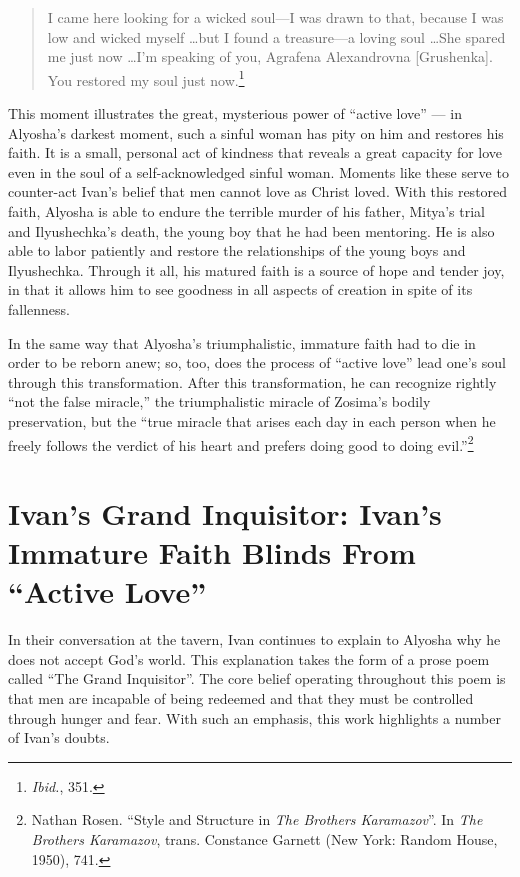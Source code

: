 \begin{quote}
\onehalfspacing
I came here looking for a wicked soul---I was drawn to that, because I was low and wicked myself \ldots but I found a treasure---a loving soul \ldots She spared me just now \ldots I'm speaking of you, Agrafena Alexandrovna [Grushenka]. You restored my soul just now.\footnote{\emph{Ibid.}, 351.}
\end{quote}

This moment illustrates the great, mysterious power of ``active love'' --- in Alyosha's darkest moment, such a sinful woman has pity on him and restores his faith. It is a small, personal act of kindness that reveals a great capacity for love even in the soul of a self-acknowledged sinful woman. Moments like these serve to counter-act Ivan's belief that men cannot love as Christ loved. With this restored faith, Alyosha is able to endure the terrible murder of his father, Mitya's trial and Ilyushechka's death, the young boy that he had been mentoring. He is also able to labor patiently and restore the relationships of the young boys and Ilyushechka. Through it all, his matured faith is a source of hope and tender joy, in that it allows him to see goodness in all aspects of creation in spite of its fallenness. 

In the same way that Alyosha's triumphalistic, immature faith had to die in order to be reborn anew; so, too, does the process of ``active love'' lead one's soul through this transformation. After this transformation, he can recognize rightly ``not the false miracle,'' the triumphalistic miracle of Zosima's bodily preservation, but the ``true miracle that arises each day in each person when he freely follows the verdict of his heart and prefers doing good to doing evil.''\footnote{Nathan Rosen. ``Style and Structure in \emph{The Brothers Karamazov}''. In \emph{The Brothers Karamazov}, trans. Constance Garnett (New York: Random House, 1950), 741.}

\section{Ivan's Grand Inquisitor: Ivan's Immature Faith Blinds From ``Active Love''}
In their conversation at the tavern, Ivan continues to explain to Alyosha why he does not accept God's world. This explanation takes the form of a prose poem called ``The Grand Inquisitor''. The core belief operating throughout this poem is that men are incapable of being redeemed and that they must be controlled through hunger and fear. With such an emphasis, this work highlights a number of Ivan's doubts.

